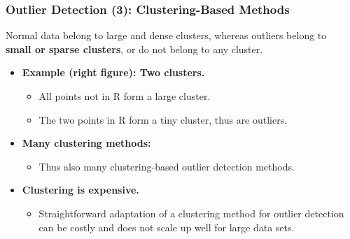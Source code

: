 \begin{frame}
	\frametitle{Outlier Detection (3): Clustering-Based Methods}
	Normal data belong to large and dense clusters, whereas outliers belong to\\ \textbf{\color{airforceblue}small or sparse clusters}, or do not belong to any cluster.
	\begin{itemize}

		\item \textbf{Example (right figure): Two clusters.}
		      \begin{itemize}
			      \item All points not in R form a large cluster.
			      \item The two points in R form a tiny cluster, thus are outliers.

		      \end{itemize}
		\item \textbf{Many clustering methods:}
		      \begin{itemize}
			      \item Thus also many clustering-based outlier detection methods.
		      \end{itemize}
		\item \textbf{Clustering is expensive.}
		      \begin{itemize}
			      \item Straightforward adaptation of a clustering method for outlier detection can be costly and does not scale up well for large data sets.
		      \end{itemize}
	\end{itemize}


\end{frame}
